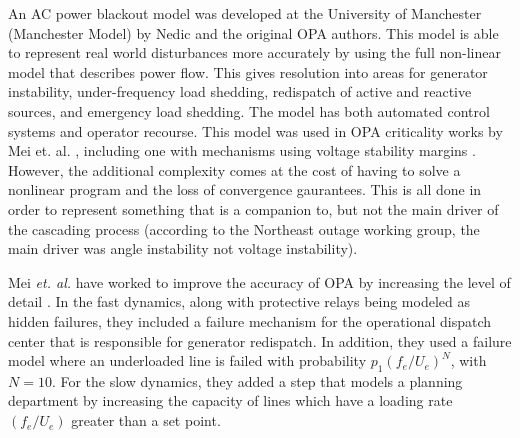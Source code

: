 An AC power blackout model was developed at the University of Manchester (Manchester Model) by Nedic \cite{nedic_2006} and the original OPA authors.  This model is able to represent real world disturbances more accurately by using the full non-linear model that describes power flow.  This gives resolution into areas for generator instability, under-frequency load shedding, redispatch of active and reactive sources, and emergency load shedding.  The model has both automated control systems and operator recourse.  This model was used in OPA criticality works by Mei et. al. \cite{mei_2006}, including one with mechanisms using voltage stability margins \cite{mei_2008}.  However, the additional complexity comes at the cost of having to solve a nonlinear program and the loss of convergence gaurantees.  This is all done in order to represent something that is a companion to, but not the main driver of the cascading process (according to the Northeast outage working group, the main driver was angle instability not voltage instability).

Mei {\it et. al.} have worked to improve the accuracy of OPA by increasing the level of detail \cite{mei_2009}.  In the fast dynamics, along with protective relays being modeled as hidden failures, they included a failure mechanism for the operational dispatch center that is responsible for generator redispatch.  In addition, they used a failure model where an underloaded line is failed with probability $p_1 \left( f_e/U_e \right)^N$, with $N=10$.  For the slow dynamics, they added a step that models a planning department by increasing the capacity of lines which have a loading rate $\left( f_{e}/ U_{e}  \right)$ greater than a set point.  

